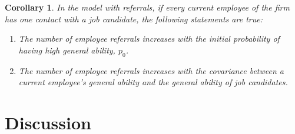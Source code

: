 \documentclass[12pt]{article}
\newtheorem{corollary}[theorem]{Corollary}
\begin{document}
\begin{corollary}\label{cor:referrals_ER_share}
    In the model with referrals, if every current employee of the firm has one contact with a job candidate, the following statements are true:
    \begin{enumerate}[label={\roman*})]
        \item The number of employee referrals increases with the initial probability of having high general ability, $p_0$.
        \item The number of employee referrals increases with the covariance between a current employee's general ability and the general ability of job candidates.
    \end{enumerate}
\end{corollary}




\section{Discussion}\label{sec:discussion}
\end{document}
